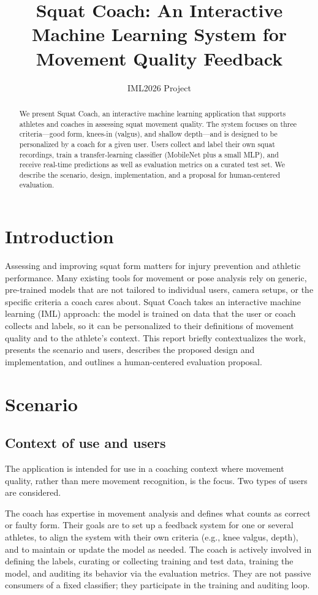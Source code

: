\documentclass[10pt,twocolumn]{article}
\title{Squat Coach: An Interactive Machine Learning System for Movement Quality Feedback}
\author{IML2026 Project}
\date{}
\begin{document}
\maketitle

\begin{abstract}
We present Squat Coach, an interactive machine learning application that supports athletes and coaches in assessing squat movement quality. The system focuses on three criteria---good form, knees-in (valgus), and shallow depth---and is designed to be personalized by a coach for a given user. Users collect and label their own squat recordings, train a transfer-learning classifier (MobileNet plus a small MLP), and receive real-time predictions as well as evaluation metrics on a curated test set. We describe the scenario, design, implementation, and a proposal for human-centered evaluation.
\end{abstract}

\section{Introduction}

Assessing and improving squat form matters for injury prevention and athletic performance. Many existing tools for movement or pose analysis rely on generic, pre-trained models that are not tailored to individual users, camera setups, or the specific criteria a coach cares about. Squat Coach takes an interactive machine learning (IML) approach: the model is trained on data that the user or coach collects and labels, so it can be personalized to their definitions of movement quality and to the athlete's context. This report briefly contextualizes the work, presents the scenario and users, describes the proposed design and implementation, and outlines a human-centered evaluation proposal.

\section{Scenario}

\subsection{Context of use and users}

The application is intended for use in a coaching context where movement quality, rather than mere movement recognition, is the focus. Two types of users are considered.

The coach has expertise in movement analysis and defines what counts as correct or faulty form. Their goals are to set up a feedback system for one or several athletes, to align the system with their own criteria (e.g., knee valgus, depth), and to maintain or update the model as needed. The coach is actively involved in defining the labels, curating or collecting training and test data, training the model, and auditing its behavior via the evaluation metrics. They are not passive consumers of a fixed classifier; they participate in the training and auditing loop.
\end{document}
